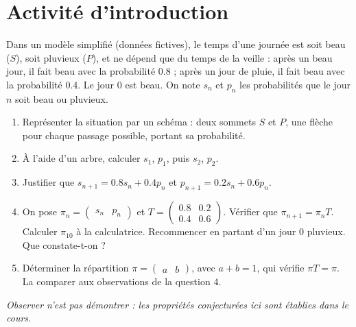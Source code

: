 \mxnewpage
\section{Activité d'introduction}
\begin{activity}
Dans un modèle simplifié (données fictives), le temps d'une journée est soit beau ($S$), soit pluvieux ($P$), et ne dépend que du temps de la veille : après un beau jour, il fait beau avec la probabilité $\num{0,8}$ ; après un jour de pluie, il fait beau avec la probabilité $\num{0,4}$. Le jour $0$ est beau. On note $s_n$ et $p_n$ les probabilités que le jour $n$ soit beau ou pluvieux.
\begin{enumerate}
\item Représenter la situation par un schéma : deux sommets $S$ et $P$, une flèche pour chaque passage possible, portant sa probabilité.
\item À l'aide d'un arbre, calculer $s_1$, $p_1$, puis $s_2$, $p_2$.
\item Justifier que $s_{n+1}=\num{0,8}s_n+\num{0,4}p_n$ et $p_{n+1}=\num{0,2}s_n+\num{0,6}p_n$.
\item On pose $\pi_n=\begin{pmatrix}s_n&p_n\end{pmatrix}$ et $T=\begin{pmatrix}\num{0,8}&\num{0,2}\\\num{0,4}&\num{0,6}\end{pmatrix}$. Vérifier que $\pi_{n+1}=\pi_nT$. Calculer $\pi_{10}$ à la calculatrice. Recommencer en partant d'un jour $0$ pluvieux. Que constate-t-on ?
\item Déterminer la répartition $\pi=\begin{pmatrix}a&b\end{pmatrix}$, avec $a+b=1$, qui vérifie $\pi T=\pi$. La comparer aux observations de la question 4.
\end{enumerate}
\par\emph{Observer n'est pas démontrer : les propriétés conjecturées ici sont établies dans le cours.}
\end{activity}
